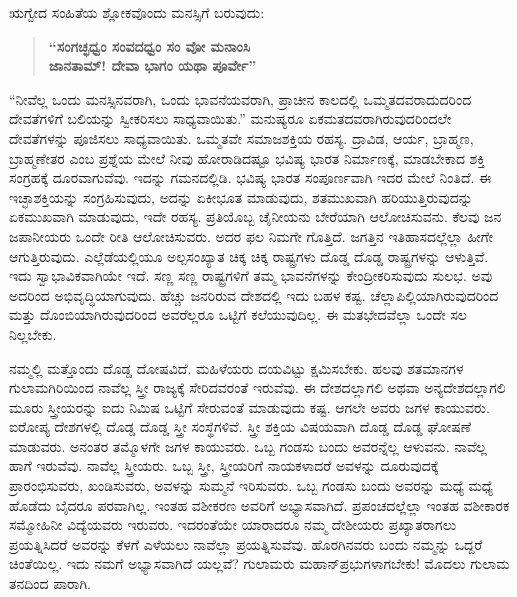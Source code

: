 \vskip 4pt

ಋಗ್ವೇದ ಸಂಹಿತೆಯ ಶ್ಲೋಕವೊಂದು ಮನಸ್ಸಿಗೆ ಬರುವುದು:

\vskip 3pt

\begin{verse}
\textbf{“ಸಂಗಚ್ಛಧ್ವಂ ಸಂವದಧ್ವಂ ಸಂ ವೋ ಮನಾಂಸಿ}\\\textbf{ಜಾನತಾಮ್​! ದೇವಾ ಭಾಗಂ ಯಥಾ ಪೂರ್ವೇ”}
\end{verse}

\vskip 3pt

“ನೀವೆಲ್ಲ ಒಂದು ಮನಸ್ಸಿನವರಾಗಿ, ಒಂದು ಭಾವನೆಯವರಾಗಿ, ಪ್ರಾಚೀನ ಕಾಲದಲ್ಲಿ ಒಮ್ಮತದವರಾದುದರಿಂದ ದೇವತೆಗಳಿಗೆ ಬಲಿಯನ್ನು ಸ್ವೀಕರಿಸಲು ಸಾಧ್ಯವಾಯಿತು.” ಮನುಷ್ಯರೂ ಏಕಮತದವರಾಗಿರುವುದರಿಂದಲೇ ದೇವತೆಗಳನ್ನು ಪೂಜಿಸಲು ಸಾಧ್ಯವಾಯಿತು. ಒಮ್ಮತವೇ ಸಮಾಜಶಕ್ತಿಯ ರಹಸ್ಯ. ದ್ರಾವಿಡ, ಆರ್ಯ, ಬ್ರಾಹ್ಮಣ, ಬ್ರಾಹ್ಮಣೇ\-ತರ ಎಂಬ ಪ್ರಶ್ನೆಯ ಮೇಲೆ ನೀವು ಹೋರಾಡಿದಷ್ಟೂ ಭವಿಷ್ಯ ಭಾರತ ನಿರ್ಮಾಣಕ್ಕೆ, ಮಾಡಬೇಕಾದ ಶಕ್ತಿ ಸಂಗ್ರಹಕ್ಕೆ ದೂರವಾಗುವೆವು. ಇದನ್ನು ಗಮನದಲ್ಲಿಡಿ. ಭವಿಷ್ಯ ಭಾರತ ಸಂಪೂರ್ಣವಾಗಿ ಇದರ ಮೇಲೆ ನಿಂತಿದೆ. ಈ ಇಚ್ಛಾಶಕ್ತಿಯನ್ನು ಸಂಗ್ರಹಿಸುವುದು, ಅದನ್ನು ಏಕೀಭೂತ ಮಾಡುವುದು, ಶತಮುಖವಾಗಿ ಹರಿಯುತ್ತಿರುವುದನ್ನು ಏಕಮುಖವಾಗಿ ಮಾಡುವುದು, ಇದೇ ರಹಸ್ಯ. ಪ್ರತಿಯೊಬ್ಬ ಚೈನೀಯನು ಬೇರೆಯಾಗಿ ಆಲೋಚಿಸುವನು. ಕೆಲವು ಜನ ಜಪಾನೀಯರು ಒಂದೇ ರೀತಿ ಆಲೋಚಿಸುವರು. ಅದರ ಫಲ ನಿಮಗೇ ಗೊತ್ತಿದೆ. ಜಗತ್ತಿನ ಇತಿಹಾಸದಲ್ಲೆಲ್ಲಾ ಹೀಗೇ ಆಗುತ್ತಿರುವುದು. ಎಲ್ಲೆಡೆಯಲ್ಲಿಯೂ ಅಲ್ಪಸಂಖ್ಯಾತ ಚಿಕ್ಕ ಚಿಕ್ಕ ರಾಷ್ಟ್ರಗಳು ದೊಡ್ಡ ದೊಡ್ಡ ರಾಷ್ಟ್ರಗಳನ್ನು ಆಳುತ್ತಿವೆ. ಇದು ಸ್ವಾಭಾವಿಕವಾಗಿಯೇ ಇದೆ. ಸಣ್ಣ ಸಣ್ಣ ರಾಷ್ಟ್ರಗಳಿಗೆ ತಮ್ಮ ಭಾವನೆಗಳನ್ನು ಕೇಂದ್ರೀಕರಿಸುವುದು ಸುಲಭ. ಅವು ಅದರಿಂದ ಅಭಿವೃದ್ಧಿಯಾಗುವುದು. ಹೆಚ್ಚು ಜನರಿರುವ ದೇಶದಲ್ಲಿ ಇದು ಬಹಳ ಕಷ್ಟ. ಚೆಲ್ಲಾಪಿಲ್ಲಿಯಾಗಿರುವುದರಿಂದ ಮತ್ತು ದೊಂಬಿಯಾಗಿರುವುದರಿಂದ ಅವರೆಲ್ಲರೂ ಒಟ್ಟಿಗೆ ಕಲೆಯುವುದಿಲ್ಲ. ಈ ಮತಭೇದವೆಲ್ಲಾ ಒಂದೇ ಸಲ ನಿಲ್ಲಬೇಕು.

\vskip 3pt

ನಮ್ಮಲ್ಲಿ ಮತ್ತೊಂದು ದೊಡ್ಡ ದೋಷವಿದೆ. ಮಹಿಳೆಯರು ದಯವಿಟ್ಟು ಕ್ಷಮಿಸಬೇಕು. ಹಲವು ಶತಮಾನಗಳ ಗುಲಾಮಗಿರಿಯಿಂದ ನಾವೆಲ್ಲ ಸ್ತ್ರೀ ರಾಜ್ಯಕ್ಕೆ ಸೇರಿದವರಂತೆ ಇರುವೆವು. ಈ ದೇಶದಲ್ಲಾಗಲಿ ಅಥವಾ ಅನ್ಯದೇಶದಲ್ಲಾಗಲಿ ಮೂರು ಸ್ತ್ರೀಯರನ್ನು ಐದು ನಿಮಿಷ ಒಟ್ಟಿಗೆ ಸೇರುವಂತೆ ಮಾಡುವುದು ಕಷ್ಟ. ಆಗಲೇ ಅವರು ಜಗಳ ಕಾಯುವರು. ಐರೋಪ್ಯ ದೇಶಗಳಲ್ಲಿ ದೊಡ್ಡ ದೊಡ್ಡ ಸ್ತ್ರೀ ಸಂಸ್ಥೆಗಳಿವೆ. ಸ್ತ್ರೀ ಶಕ್ತಿಯ ವಿಷಯವಾಗಿ ದೊಡ್ಡ ದೊಡ್ಡ ಘೋಷಣೆ ಮಾಡುವರು. ಅನಂತರ ತಮ್ಮೊಳಗೇ ಜಗಳ ಕಾಯುವರು. ಒಬ್ಬ ಗಂಡಸು ಬಂದು ಅವರನ್ನೆಲ್ಲ ಆಳುವನು. ನಾವೆಲ್ಲ ಹಾಗೆ ಇರುವೆವು. ನಾವೆಲ್ಲ ಸ್ತ್ರೀಯರು. ಒಬ್ಬ ಸ್ತ್ರೀ, ಸ್ತ್ರೀಯರಿಗೆ ನಾಯಕಳಾದರೆ ಅವಳನ್ನು ದೂರುವುದಕ್ಕೆ ಪ್ರಾರಂಭಿಸುವರು, ಖಂಡಿಸುವರು, ಅವಳನ್ನು ಸುಮ್ಮನೆ ಇರಿಸುವರು. ಒಬ್ಬ ಗಂಡಸು ಬಂದು ಅವರನ್ನು ಮಧ್ಯೆ ಮಧ್ಯೆ ಹೊಡೆದು ಬೈದರೂ ಪರವಾಗಿಲ್ಲ. ಇಂತಹ ವಶೀಕರಣ ಅವರಿಗೆ ಅಭ್ಯಾಸವಾಗಿದೆ. ಪ್ರಪಂಚದಲ್ಲೆಲ್ಲಾ ಇಂತಹ ವಶೀಕಾರಕ ಸಮ್ಮೋಹಿನೀ ವಿದ್ಯೆಯವರು ಇರುವರು. ಇದರಂತೆಯೇ ಯಾರಾದರೂ ನಮ್ಮ ದೇಶೀಯರು ಪ್ರಖ್ಯಾತರಾಗಲು ಪ್ರಯತ್ನಿಸಿದರೆ ಅವರನ್ನು ಕೆಳಗೆ ಎಳೆಯಲು ನಾವೆಲ್ಲಾ ಪ್ರಯತ್ನಿಸುವೆವು. ಹೊರಗಿನವರು ಬಂದು ನಮ್ಮನ್ನು ಒದ್ದರೆ ಚಿಂತೆಯಿಲ್ಲ. ಇದು ನಮಗೆ ಅಭ್ಯಾಸವಾಗಿದೆ ಯಲ್ಲವೆ? ಗುಲಾಮರು ಮಹಾನ್​ ಪ್ರಭುಗಳಾಗಬೇಕು! ಮೊದಲು ಗುಲಾಮ ತನದಿಂದ ಪಾರಾಗಿ.

